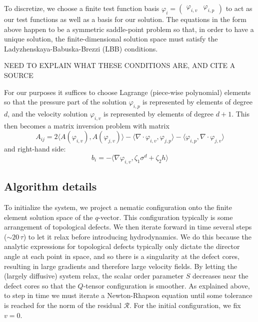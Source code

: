 \documentclass[reqno]{article}
\begin{document}
  To discretize, we choose a finite test function basis $\varphi_i
  = \begin{pmatrix} \varphi_{i, v} &\varphi_{i, p} \end{pmatrix}$ to act
  as our test functions as well as a basis for our solution.
  The equations in the form above happen to be a symmetric saddle-point problem
  so that, in order to have a unique solution, the finite-dimensional solution
  space must satisfy the Ladyzhenskaya-Babuska-Brezzi (LBB) conditions.

  NEED TO EXPLAIN WHAT THESE CONDITIONS ARE, AND CITE A SOURCE
  
  For our purposes it suffices to choose Lagrange (piece-wise polynomial)
  elements so that the pressure part of the solution $\varphi_{i, p}$ is
  represented by elements of degree $d$, and the velocity solution $\varphi_{i, v}$ is
  represented by elements of degree $d + 1$.
  This then becomes a matrix inversion problem with matrix
  \begin{equation}
    A_{ij}
    =
    2 \langle A(\varphi_{i, v}), A(\varphi_{j, v}) \rangle
    - \langle \nabla \cdot \varphi_{i, v}, \varphi_{j, p} \rangle
    - \langle \varphi_{i, p}, \nabla \cdot \varphi_{j, v} \rangle
  \end{equation}
  and right-hand side:
  \begin{equation}
    b_i
    =
    - \langle \nabla \varphi_{i, v}, \zeta_1 \sigma^d + \zeta_2 h \rangle
  \end{equation}

  \subsection{Algorithm details}
  To initialize the system, we project a nematic configuration onto the finite
  element solution space of the $q$-vector.
  This configuration typically is some arrangement of topological defects.
  We then iterate forward in time several steps ($\sim 20 \, \tau$) to let it
  relax before introducing hydrodynamics.
  We do this because the analytic expressions for topological defects typically
  only dictate the director angle at each point in space, and so there is a
  singularity at the defect cores, resulting in large gradients and therefore
  large velocity fields.
  By letting the (largely diffusive) system relax, the scalar order parameter
  $S$ decreases near the defect cores so that the $Q$-tensor configuration is
  smoother.
  As explained above, to step in time we must iterate a Newton-Rhapson equation
  until some tolerance is reached for the norm of the residual $\mathcal{R}$.
  For the initial configuration, we fix $v = 0$.
\end{document}
